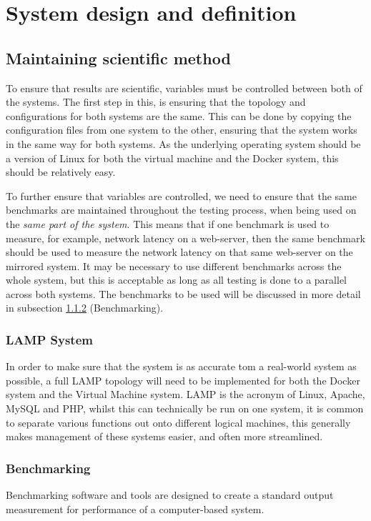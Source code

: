 \chapter{System design and definition}


\section{Maintaining scientific method}
To ensure that results are scientific, variables must be controlled between both of the systems. The first step in this, is ensuring that the topology and configurations for both systems are the same. This can be done by copying the configuration files from one system to the other, ensuring that the system works in the same way for both systems. As the underlying operating system should be a version of Linux for both the virtual machine and the Docker system, this should be relatively easy.

To further ensure that variables are controlled, we need to ensure that the same benchmarks are maintained throughout the testing process, when being used on the \emph{same part of the system}. This means that if one benchmark is used to measure, for example, network latency on a web-server, then the same benchmark should be used to measure the network latency on that same web-server on the mirrored system. It may be necessary to use different benchmarks across the whole system, but this is acceptable as long as all testing is done to a parallel across both systems. The benchmarks to be used will be discussed in more detail in subsection \ref{sub:Benchmarking} (Benchmarking).

\subsection{LAMP System}
In order to make sure that the system is as accurate tom a real-world system as possible, a full LAMP topology will need to be implemented for both the Docker system and the Virtual Machine system. LAMP is the acronym of Linux, Apache, MySQL and PHP, whilst this can technically be run on one system, it is common to separate various functions out onto different logical machines, this generally makes management of these systems easier, and often more streamlined.

\subsection{Benchmarking}
\label{sub:Benchmarking}
Benchmarking software and tools are designed to create a standard output measurement for performance of a computer-based system\citep{fleming1986}.


